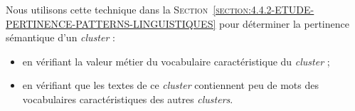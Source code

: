 		\begin{leftBarAuthorOpinion}
			Nous utilisons cette technique dans la \textsc{Section~\ref{section:4.4.2-ETUDE-PERTINENCE-PATTERNS-LINGUISTIQUES}} pour déterminer la pertinence sémantique d'un \textit{cluster} :
			\begin{itemize}
				\item en vérifiant la valeur métier du vocabulaire caractéristique du \textit{cluster} ;
				\item en vérifiant que les textes de ce \textit{cluster} contiennent peu de mots des vocabulaires caractéristiques des autres \textit{clusters}.
			\end{itemize}
		\end{leftBarAuthorOpinion}